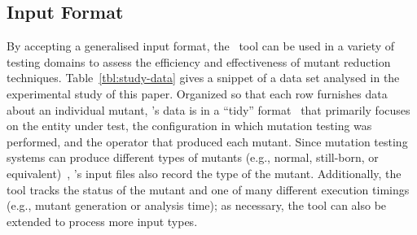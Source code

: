 \subsection{Input Format}


By accepting a generalised input format, the \mr~tool can be used in a variety of testing domains to assess the
efficiency and effectiveness of mutant reduction techniques. Table~\ref{tbl:study-data} gives a snippet of a data set
analysed in the experimental study of this paper. Organized so that each row furnishes data about an individual mutant,
\mr's data is in a ``tidy'' format~\cite{Wickham2014} that primarily focuses on the entity under test, the configuration
in which mutation testing was performed, and the operator that produced each mutant. Since mutation testing systems can
produce different types of mutants (e.g., normal, still-born, or equivalent)~\cite{Wright2014}, \mr's input files also
record the type of the mutant. Additionally, the tool tracks the status of the mutant and one of many different
execution timings (e.g., mutant generation or analysis time); as necessary, the tool can also be extended to process
more input types.






% 
% 
% 
